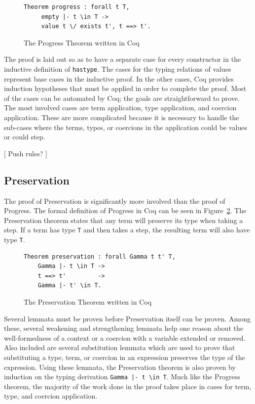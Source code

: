 \documentclass{sig-alternate}
\begin{document}
\begin{figure}[h!]
\begin{lstlisting}
Theorem progress : forall t T, 
     empty |- t \in T ->
     value t \/ exists t', t ==> t'.
\end{lstlisting}
\caption{The Progress Theorem written in Coq}
\label{fig:progress-coq}
\end{figure}

The proof is laid out so as to have a separate case for every constructor in the inductive definition of \texttt{has\textunderscore type}. The cases for the typing relations of values represent base cases in the inductive proof. In the other cases, Coq provides induction hypotheses that must be applied in order to complete the proof. Most of the cases can be automated by Coq; the goals are straightforward to prove. The most involved cases are term application, type application, and coercion application. These are more complicated because it is necessary to handle the sub-cases where the terms, types, or coercions in the application could be values or could step.

[ Push rules? ]

\subsection{Preservation}
\label{sec:implementation-preservation}

The proof of Preservation is significantly more involved than the proof of Progress. The formal definition of Progress in Coq can be seen in Figure~\ref{fig:preservation-coq}. The Preservation theorem states that any term will preserve its type when taking a step. If a term has type \texttt{T} and then takes a step, the resulting term will also have type \texttt{T}. 

\begin{figure}[h!]
\begin{lstlisting}
Theorem preservation : forall Gamma t t' T, 
    Gamma |- t \in T ->
    t ==> t'         ->
    Gamma |- t' \in T.
\end{lstlisting}
\caption{The Preservation Theorem written in Coq}
\label{fig:preservation-coq}
\end{figure}

Several lemmata must be proven before Preservation itself can be proven. Among these, several weakening and strengthening lemmata help one reason about the well-formedness of a context or a coercion with a variable extended or removed. Also included are several substitution lemmata which are used to prove that substituting a type, term, or coercion in an expression preserves the type of the expression. Using these lemmata, the Preservation theorem is also proven by induction on the typing derivation \texttt{Gamma |- t \textbackslash in T}. Much like the Progress theorem, the majority of the work done in the proof takes place in cases for term, type, and coercion application.
\end{document}
